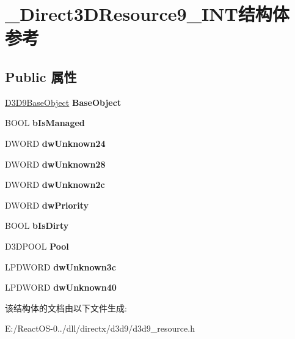 \hypertarget{struct___direct3_d_resource9___i_n_t}{}\section{\+\_\+\+Direct3\+D\+Resource9\+\_\+\+I\+N\+T结构体 参考}
\label{struct___direct3_d_resource9___i_n_t}
\subsection*{Public 属性}
\begin{DoxyCompactItemize}
\item 
\mbox{\label{struct___direct3_d_resource9___i_n_t_ac5fa8d991598b5623aaaf7a3f5abd0f0}} 
\hyperlink{struct___d3_d9_base_object}{D3\+D9\+Base\+Object} {\bfseries Base\+Object}
\item 
\mbox{\label{struct___direct3_d_resource9___i_n_t_ac654bdea0430d857d373a48ee8b1fc3d}} 
B\+O\+OL {\bfseries b\+Is\+Managed}
\item 
\mbox{\label{struct___direct3_d_resource9___i_n_t_acddc8081b7b2eb18ee71f20744038c44}} 
D\+W\+O\+RD {\bfseries dw\+Unknown24}
\item 
\mbox{\label{struct___direct3_d_resource9___i_n_t_a26a094f13370bf37dd9b4fc828ddcc0f}} 
D\+W\+O\+RD {\bfseries dw\+Unknown28}
\item 
\mbox{\label{struct___direct3_d_resource9___i_n_t_aa9818c06db4ff1b14d219d4fdc078915}} 
D\+W\+O\+RD {\bfseries dw\+Unknown2c}
\item 
\mbox{\label{struct___direct3_d_resource9___i_n_t_a5187f37e82d37c19be399548736d0158}} 
D\+W\+O\+RD {\bfseries dw\+Priority}
\item 
\mbox{\label{struct___direct3_d_resource9___i_n_t_ab22fc66c45c38092abfc9ae778c4fb22}} 
B\+O\+OL {\bfseries b\+Is\+Dirty}
\item 
\mbox{\label{struct___direct3_d_resource9___i_n_t_a36ae9fdf851a6059c3ebad828b16e1e1}} 
D3\+D\+P\+O\+OL {\bfseries Pool}
\item 
\mbox{\label{struct___direct3_d_resource9___i_n_t_afbea57fe7280a1e8614bc8cfafd2f817}} 
L\+P\+D\+W\+O\+RD {\bfseries dw\+Unknown3c}
\item 
\mbox{\label{struct___direct3_d_resource9___i_n_t_a3baf6b461a1c8b141eb1b802d09d3e1c}} 
L\+P\+D\+W\+O\+RD {\bfseries dw\+Unknown40}
\end{DoxyCompactItemize}


该结构体的文档由以下文件生成\+:\begin{DoxyCompactItemize}
\item 
E\+:/\+React\+O\+S-\/0../dll/directx/d3d9/d3d9\+\_\+resource.\+h\end{DoxyCompactItemize}

